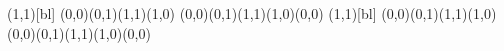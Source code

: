 \savebox{\carre}(1,1)[bl]{%
  \roundjoin
  \color{white}
  \polygon*(0,0)(0,1)(1,1)(1,0)
  \color{black}
  \polyline(0,0)(0,1)(1,1)(1,0)(0,0)}
\savebox{\ccarre}(1,1)[bl]{%
  \roundjoin
  \color{indexedface}
  \polygon*(0,0)(0,1)(1,1)(1,0)
  \color{black}
  \polyline(0,0)(0,1)(1,1)(1,0)(0,0)}

